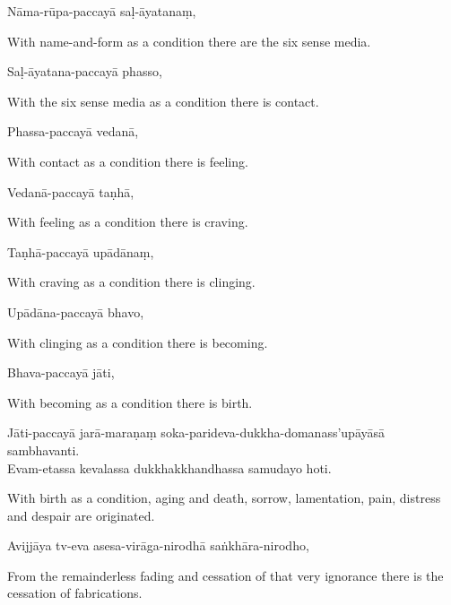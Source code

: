 Nāma-rūpa-paccayā saḷ-āyatanaṃ,

\begin{english}
  With name-and-form as a condition there are the six sense media.
\end{english}

Saḷ-āyatana-paccayā phasso,

\begin{english}
  With the six sense media as a condition there is contact.
\end{english}

Phassa-paccayā vedanā,

\begin{english}
  With contact as a condition there is feeling.
\end{english}

Vedanā-paccayā taṇhā,

\begin{english}
  With feeling as a condition there is craving.
\end{english}

Taṇhā-paccayā upādānaṃ,

\begin{english}
  With craving as a condition there is clinging.
\end{english}

Upādāna-paccayā bhavo,

\begin{english}
  With clinging as a condition there is becoming.
\end{english}

Bhava-paccayā jāti,

\begin{english}
  With becoming as a condition there is birth.
\end{english}

Jāti-paccayā jarā-maraṇaṃ soka-parideva-dukkha-domanass'upāyāsā sambhavanti.\\
Evam-etassa kevalassa dukkhakkhandhassa samudayo hoti.

\begin{english}
  With birth as a condition, aging and death, sorrow, lamentation, pain,
  distress and despair are originated.
\end{english}

Avijjāya tv-eva asesa-virāga-nirodhā saṅkhāra-nirodho,

\begin{english}
  From the remainderless fading and cessation of that very ignorance there is the
  cessation of fabrications.
\end{english}


